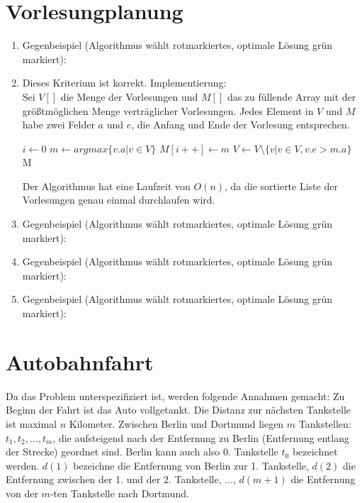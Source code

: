 \documentclass[a4paper,10pt]{scrartcl}
\begin{document}
\section{Vorlesungplanung}
\begin{enumerate}
 \item Gegenbeispiel (Algorithmus wählt rotmarkiertes, optimale Lösung grün markiert):
  \vfill

  \item Dieses Kriterium ist korrekt. Implementierung: \\
	Sei $V[]$ die Menge der Vorlesungen und $M[]$ das zu füllende
	Array mit der größtmöglichen Menge verträglicher Vorlesungen.
	Jedes Element in $V$ und $M$ habe zwei Felder $a$ und $e$, die
	Anfang und Ende der Vorlesung entsprechen.
	\begin{algorithmic}
		\STATE $i \gets 0$
			\STATE $m \gets argmax\{v.a | v \in V\}$
			\STATE $M[i++] \gets m$
			\STATE $V \gets V \setminus \{v | v \in V, v.e > m.a\}$
		\ENDWHILE
		\RETURN M
	\end{algorithmic}
	Der Algorithmus hat eine Laufzeit von $O(n)$, da die sortierte
	Liste der Vorlesungen genau einmal durchlaufen wird.
  \item Gegenbeispiel (Algorithmus wählt rotmarkiertes, optimale Lösung grün markiert):
 \vfill

\item Gegenbeispiel (Algorithmus wählt rotmarkiertes, optimale Lösung grün markiert):

 \vfill
\item Gegenbeispiel (Algorithmus wählt rotmarkiertes, optimale Lösung grün markiert):

 \vfill
\end{enumerate}
\section{Autobahnfahrt}
Da das Problem unterspezifiziert ist, werden folgende Annahmen gemacht: Zu Beginn der Fahrt ist das Auto vollgetankt. Die Distanz zur nächsten Tankstelle ist maximal $n$ Kilometer.
Zwischen Berlin und Dortmund liegen $m$ Tankstellen: $t_1, t_2, \hdots, t_m$, die aufsteigend nach der Entfernung zu Berlin (Entfernung entlang der Strecke) geordnet sind. Berlin kann auch also 0.
Tankstelle $t_0$ bezeichnet werden.
$d(1)$ bezeichne die Entfernung von Berlin zur 1. Tankstelle, $d(2)$ die Entfernung zwischen der 1. und der 2. Tankstelle, $\hdots$, $d(m + 1)$ die Entfernung von der $m$-ten Tankstelle nach Dortmund.
\end{document}
